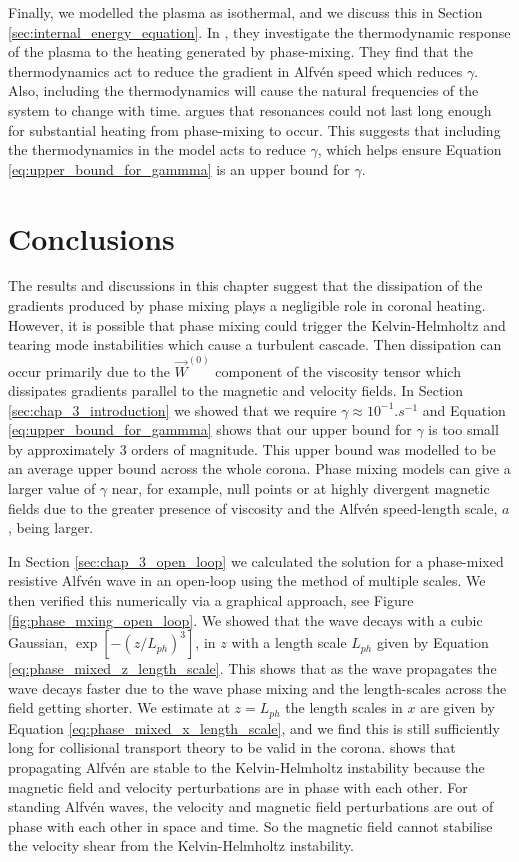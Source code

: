 Finally, we modelled the plasma as isothermal, and we discuss this in Section \ref{sec:internal_energy_equation}. In \citet{Cargill2016}, they investigate the thermodynamic response of the plasma to the heating generated by phase-mixing. They find that the thermodynamics act to reduce the gradient in Alfv\'en speed which reduces $\gamma$. Also, including the thermodynamics will cause the natural frequencies of the system to change with time. \citet{Arregui2015} argues that resonances could not last long enough for substantial heating from phase-mixing to occur. This suggests that including the thermodynamics in the model acts to reduce $\gamma$, which helps ensure Equation \eqref{eq:upper_bound_for_gammma} is an upper bound for $\gamma$.

\section{Conclusions}

The results and discussions in this chapter suggest that the dissipation of the gradients produced by phase mixing plays a negligible role in coronal heating. However, it is possible that phase mixing could trigger the Kelvin-Helmholtz and tearing mode instabilities which cause a turbulent cascade. Then dissipation can occur primarily due to the $\vec{W}^{(0)}$ component of the viscosity tensor which dissipates gradients parallel to the magnetic and velocity fields. In Section \ref{sec:chap_3_introduction} we showed that we require $\gamma\approx10^{-1}\si{.s^{-1}}$ and Equation \eqref{eq:upper_bound_for_gammma} shows that our upper bound for $\gamma$ is too small by approximately 3 orders of magnitude. This upper bound was modelled to be an average upper bound across the whole corona. Phase mixing models can give a larger value of $\gamma$ near, for example, null points or at highly divergent magnetic fields due to the greater presence of viscosity and the Alfv\'en speed-length scale, $a$, being larger.

In Section \ref{sec:chap_3_open_loop} we calculated the solution for a phase-mixed resistive Alfv\'en wave in an open-loop using the method of multiple scales. We then verified this numerically via a graphical approach, see Figure \ref{fig:phase_mxing_open_loop}. We showed that the wave decays with a cubic Gaussian, $\exp[-(z/L_{ph})^3]$, in $z$ with a length scale $L_{ph}$ given by Equation \eqref{eq:phase_mixed_z_length_scale}. This shows that as the wave propagates the wave decays faster due to the wave phase mixing and the length-scales across the field getting shorter. We estimate at $z=L_{ph}$ the length scales in $x$ are given by Equation \eqref{eq:phase_mixed_x_length_scale}, and we find this is still sufficiently long for collisional transport theory to be valid in the corona. \citet{Heyvaerts1983} shows that propagating Alfv\'en are stable to the Kelvin-Helmholtz instability because the magnetic field and velocity perturbations are in phase with each other. For standing Alfv\'en waves, the velocity and magnetic field perturbations are out of phase with each other in space and time. So the magnetic field cannot stabilise the velocity shear from the Kelvin-Helmholtz instability.

